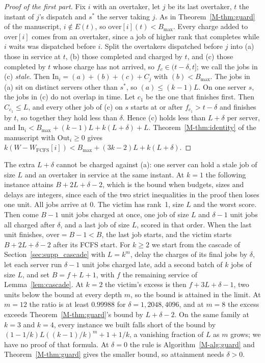 \documentclass[mathematics,supfile,submit,moreauthors]{Definitions/mdpi}
\begin{document}
\begin{proof}[Proof of the first part]
Fix $i$ with an overtaker, let $j$ be its last overtaker, $t$ the instant of $j$'s
dispatch and $s^*$ the server taking $j$. As in Theorem~\ref*{M-thm:guard} of the manuscript,
$i \notin E(t)$, so $\mathrm{over}[i](t) < B_{\max}$. Every charge added to
$\mathrm{over}[i]$ comes from an overtaker, since a job of higher rank that completes
while $i$ waits was dispatched before $i$. Split the overtakers dispatched before $j$
into (a) those in service at $t$, (b) those completed and charged by $t$, and (c) those
completed by $t$ whose charge has not arrived, so $f_c \in (t - \delta, t]$; we call the
jobs in (c) \emph{stale}. Then
$\mathrm{In}_i = (a) + (b) + (c) + C_j$ with $(b) < B_{\max}$. The jobs in (a) sit on
distinct servers other than $s^*$, so $(a) \le (k-1)L$. On one server $s$, the jobs in
(c) do not overlap in time. Let $c_1$ be the one that finishes first. Then
$C_{c_1} \le L$, and every other job of (c) on $s$ starts at or after
$f_{c_1} > t - \delta$ and finishes by $t$, so together they hold less than $\delta$.
Hence (c) holds less than $L + \delta$ per server, and
$\mathrm{In}_i < B_{\max} + (k-1)L + k(L + \delta) + L$. Theorem~\ref*{M-thm:identity} of the manuscript
with $\mathrm{Out}_i \ge 0$ gives
$k(W - W_{\mathrm{FCFS}}[i]) < B_{\max} + (3k-2)L + k(L + \delta)$.
\end{proof}

The extra $L + \delta$ cannot be charged against (a): one server can hold a stale job of
size $L$ and an overtaker in service at the same instant. At $k = 1$ the following
instance attains $B + 2L + \delta - 2$, which is the bound when budgets, sizes and delays
are integers, since each of the two strict inequalities in the proof then loses one unit. All jobs arrive
at $0$. The victim has rank~1, size $L$ and the worst score. Then come $B - 1$ unit jobs
charged at once, one job of size $L$ and $\delta - 1$ unit jobs all charged after
$\delta$, and a last job of size $L$, scored in that order. When the last unit
finishes, $\mathrm{over} = B - 1 < B$, the last job starts, and the victim starts
$B + 2L + \delta - 2$ after its FCFS start. For $k \ge 2$ we start from the cascade of Section~\ref{sec:supp_cascade} with $L = k^m$, delay the charges
of its final jobs by $\delta$, let each server run $\delta - 1$ unit jobs charged late, add
a second batch of $k$ jobs of size $L$, and set $B = f + L + 1$, with $f$ the remaining
service of Lemma~\ref{lem:cascade}. At $k = 2$ the victim's
excess is then $f + 3L + \delta - 1$, two units below the bound at every depth $m$, so the
bound is attained in the limit. At $m = 12$ the ratio is at least $0.99988$ for
$\delta = 1, 2048, 4096$, and at $m = 8$ the excess exceeds Theorem~\ref*{M-thm:guard}'s bound by
$L + \delta - 2$. On the same family at $k = 3$ and $k = 4$, every instance we built
falls short of the bound by $(1 - 1/k)L((k-1)/k)^m + 1 + 1/k$, a vanishing fraction of
$L$ as $m$ grows; we have no proof of that formula. At $\delta = 0$ the rule is
Algorithm~\ref*{M-alg:guard} and Theorem~\ref*{M-thm:guard} gives the smaller bound, so attainment needs $\delta > 0$.
\end{document}
